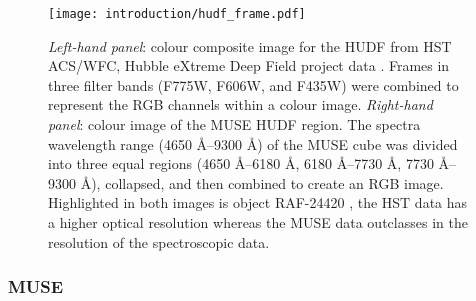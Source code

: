 \documentclass[12pt, twocolumn]{revtex4-1}    %
\begin{document}

\begin{figure}
\texttt{[image: introduction/hudf\_frame.pdf]}
\captionsetup{justification=justified, format=plain}
\caption[Hubble Ultra Deep Field]{\textit{Left-hand panel}: colour composite image for the HUDF from HST ACS/WFC, Hubble eXtreme Deep Field project data \citep{2013ApJS..209....6I}. Frames in three filter bands (F775W, F606W, and F435W) were combined to represent the RGB channels within a colour image. \textit{Right-hand panel}: colour image of the MUSE HUDF region. The spectra wavelength range (4650 \AA--9300 \AA) of the MUSE cube was divided into three equal regions (4650 \AA--6180 \AA, 6180 \AA--7730 \AA, 7730 \AA -- 9300 \AA), collapsed, and then combined to create an RGB image. Highlighted in both images is object RAF-24420 \citep{2015AJ....150...31R}, the HST data has a higher optical resolution whereas the MUSE data outclasses in the resolution of the spectroscopic data.}
\label{fig:hst_muse_hdf}
\end{figure}


\subsubsection{MUSE}

\end{document}
